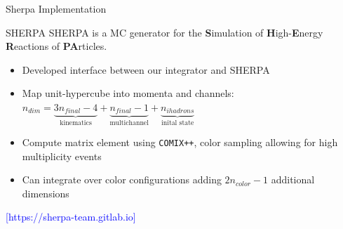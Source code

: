 \documentclass{beamer}
\newcommand\reference[1]{%
{\tiny \textcolor{blue}{[#1]}}
}
\begin{document}
\begin{frame}{Sherpa Implementation}
    \begin{block}{SHERPA}
        SHERPA is a MC generator for the \textbf{S}imulation of \textbf{H}igh-\textbf{E}nergy \textbf{R}eactions of \textbf{PA}rticles.
        \begin{itemize}
            \item Developed interface between our integrator and SHERPA
            \item Map unit-hypercube into momenta and channels: $n_{dim} = \underbrace{3n_{final}-4}_{\text{kinematics}} + \underbrace{n_{final}-1}_{\text{multichannel}} + \underbrace{n_{ihadrons}}_{\text{inital state}}$
            \item Compute matrix element using {\tt COMIX++}, color sampling allowing for high multiplicity events
            \item Can integrate over color configurations adding $2 n_{color} -1$ additional dimensions
        \end{itemize}
        \begin{flushright}\reference{https://sherpa-team.gitlab.io}\end{flushright}
    \end{block}
\end{frame}
\end{document}
